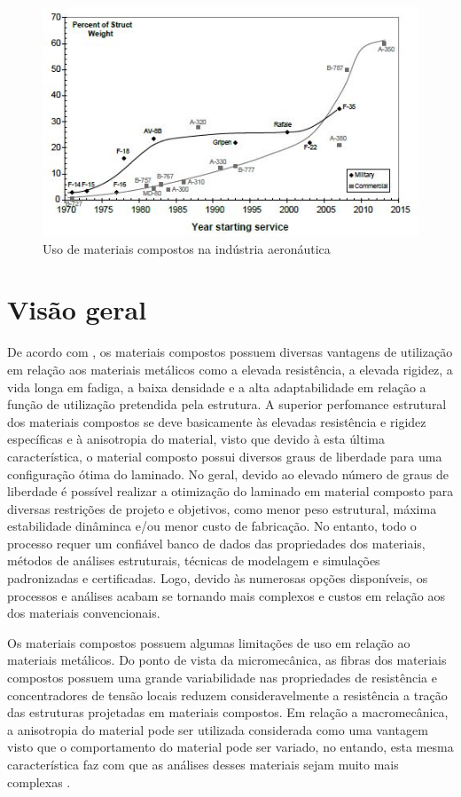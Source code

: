 \begin{figure}[h]
	\caption{\label{fig_usecomposites}Uso de materiais compostos na indústria aeronáutica}
  \centering
  \includegraphics[scale=1.1]{figura/UseOfComposites}
\end{figure}

\section{Visão geral}
De acordo com \cite{daniel2006engineering}, os materiais compostos possuem diversas vantagens de utilização em relação aos materiais metálicos como a elevada resistência, a elevada rigidez, a vida longa em fadiga, a baixa densidade e a alta adaptabilidade em relação a função de utilização pretendida pela estrutura. A superior perfomance estrutural dos materiais compostos se deve basicamente às elevadas resistência e rigidez específicas e à anisotropia do material, visto que devido à esta última característica, o material composto possui diversos graus de liberdade para uma configuração ótima do laminado. No geral, devido ao elevado número de graus de liberdade é possível realizar a otimização do laminado em material composto para diversas restrições de projeto e objetivos, como menor peso estrutural, máxima estabilidade dinâminca e/ou menor custo de fabricação. No entanto, todo o processo requer um confiável banco de dados das propriedades dos materiais, métodos de análises estruturais, técnicas de modelagem e simulações padronizadas e certificadas. Logo, devido às numerosas opções disponíveis, os processos e análises acabam se tornando mais complexos e custos em relação aos dos materiais convencionais.

Os materiais compostos possuem algumas limitações de uso em relação ao materiais metálicos. Do ponto de vista da micromecânica, as fibras dos materiais compostos possuem uma grande variabilidade nas propriedades de resistência e concentradores de tensão locais reduzem consideravelmente a resistência a tração das estruturas projetadas em materiais compostos. Em relação a macromecânica, a anisotropia do material pode ser utilizada considerada como uma vantagem visto que o comportamento do material pode ser variado, no entando, esta mesma característica faz com que as análises desses materiais sejam muito mais complexas \cite{daniel2006engineering}.

